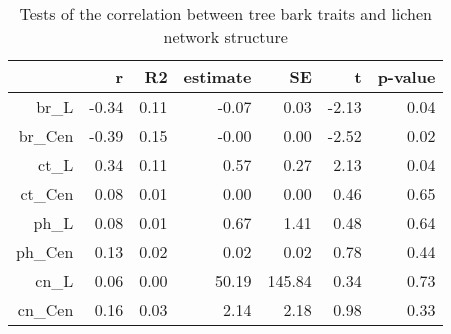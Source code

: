 \begin{table}[ht]
\centering
\begin{tabular}{rrrrrrr}
  \hline
 & r & R2 & estimate & SE & t & p-value \\ 
  \hline
br\_L & -0.34 & 0.11 & -0.07 & 0.03 & -2.13 & 0.04 \\ 
  br\_Cen & -0.39 & 0.15 & -0.00 & 0.00 & -2.52 & 0.02 \\ 
  ct\_L & 0.34 & 0.11 & 0.57 & 0.27 & 2.13 & 0.04 \\ 
  ct\_Cen & 0.08 & 0.01 & 0.00 & 0.00 & 0.46 & 0.65 \\ 
  ph\_L & 0.08 & 0.01 & 0.67 & 1.41 & 0.48 & 0.64 \\ 
  ph\_Cen & 0.13 & 0.02 & 0.02 & 0.02 & 0.78 & 0.44 \\ 
  cn\_L & 0.06 & 0.00 & 50.19 & 145.84 & 0.34 & 0.73 \\ 
  cn\_Cen & 0.16 & 0.03 & 2.14 & 2.18 & 0.98 & 0.33 \\ 
   \hline
\end{tabular}
\caption{Tests of the correlation between tree bark traits and lichen network structure} 
\label{tab:trait_path}
\end{table}

